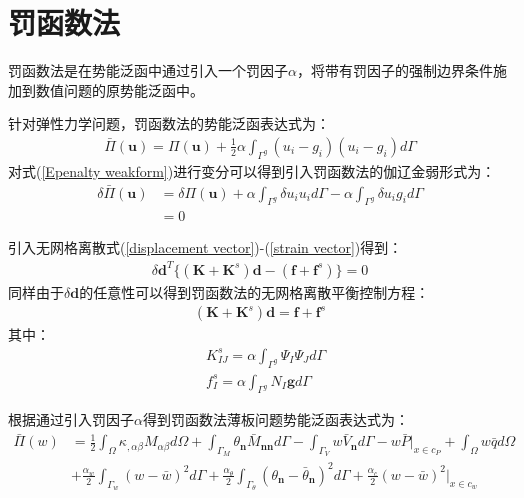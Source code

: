 \section{罚函数法}
罚函数法\cite{}是在势能泛函中通过引入一个罚因子$\alpha$，将带有罚因子的强制边界条件施加到数值问题的原势能泛函中。\par
针对弹性力学问题，罚函数法的势能泛函表达式为：
\begin{equation}\label{Epenalty weakform}
\begin{split}
    \bar{\Pi}(\pmb{u})=\Pi(\pmb{u})+\frac{1}{2}\alpha\int_{\Gamma^g}(u_i-g_i)(u_i-g_i)d\Gamma
\end{split}
\end{equation}
对式(\ref{Epenalty weakform})进行变分可以得到引入罚函数法的伽辽金弱形式为：
\begin{equation}
\begin{split}
    \delta\bar{\Pi}(\pmb{u})&=\delta\Pi(\pmb{u})+\alpha\int_{\Gamma^g}\delta u_iu_id\Gamma-\alpha\int_{\Gamma^g}\delta u_ig_id\Gamma\\
    &=0
\end{split}                                                 
\end{equation}\par
引入无网格离散式(\ref{displacement vector})-(\ref{strain vector})得到：
\begin{equation}
\begin{split}
      \delta\pmb{d}^T\{(\pmb{K}+\pmb{K}^s)\pmb{d}-(\pmb{f}+\pmb{f}^s)\}=0
\end{split}                                                 
\end{equation}
同样由于$\delta\pmb{d}$的任意性可以得到罚函数法的无网格离散平衡控制方程：
\begin{equation}
\begin{split}
    (\pmb{K}+\pmb{K}^s)\pmb{d}=\pmb{f}+\pmb{f}^s
\end{split}
\end{equation}
其中：
\begin{equation}
\begin{split}
  &K^s_{IJ}=\alpha\int_{\Gamma^g}\Psi_I\Psi_Jd\Gamma\\
  &f^s_I=\alpha\int_{\Gamma^g}N_I\pmb{g}d\Gamma
\end{split}
\end{equation}\par
根据\cite{}通过引入罚因子$\alpha$得到罚函数法薄板问题势能泛函表达式为：
\begin{equation}\label{Ppenalty}
\begin{split}
        \bar{\Pi}(w)&=\frac{1}{2}\int_{\Omega}\kappa_{,\alpha\beta}M_{\alpha\beta}d\Omega+\int_{\Gamma_M}\theta_{\pmb{n}}\bar{M}_{\pmb{nn}}d\Gamma-\int_{\Gamma_V}w\bar{V}_{\pmb{n}}d\Gamma-w\bar{P}\vert_{x\in c_P}+\int_{\Omega}w\bar{q}d\Omega\\
    &+\frac{\alpha_w}{2}\int_{\Gamma_w}(w-\bar{w})^2d\Gamma+\frac{\alpha_{\theta}}{2}\int_{\Gamma_{\theta}}(\theta_{\pmb{n}}-\bar{\theta}_{\pmb{n}})^2d\Gamma+\frac{\alpha_c}{2}(w-\bar{w})^2\vert_{x\in c_w}
\end{split}
\end{equation}
